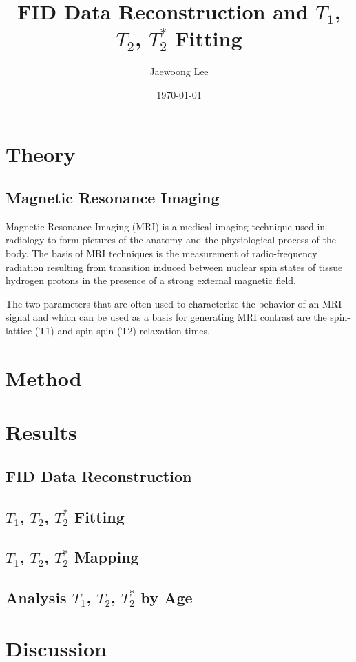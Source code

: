 \documentclass[10pt, a4paper]{article}
\title{FID Data Reconstruction and $T_1$, $T_2$, $T_2^{*}$ Fitting}
\author{Jaewoong Lee}
\date{\today}
\begin{document}
    \maketitle
	\newpage
	
	\tableofcontents
	\listoftables
	\listoffigures
	\newpage
	
	\section{Theory}
		\subsection{Magnetic Resonance Imaging}
			Magnetic Resonance Imaging (MRI) is a medical imaging technique used in radiology to form pictures of the anatomy and the physiological process of the body. The basis of MRI techniques is the measurement of radio-frequency radiation resulting from transition induced between nuclear spin states of tissue hydrogen protons in the presence of a strong external magnetic field. \cite{ref:MRI1}
			
			The two parameters that are often used to characterize the behavior of an MRI signal and which can be used as a basis for generating MRI contrast are the spin-lattice (T1) and spin-spin (T2) relaxation times. \cite{ref:MRI1}
	
	\section{Method}
	
	\section{Results}
		\subsection{FID Data Reconstruction}
		
		\subsection{$T_1$, $T_2$, $T_2^*$ Fitting}
		
		\subsection{$T_1$, $T_2$, $T_2^*$ Mapping}
		
		\subsection{Analysis $T_1$, $T_2$, $T_2^*$  by Age}
	
	\section{Discussion}
	
	
	
\end{document}
